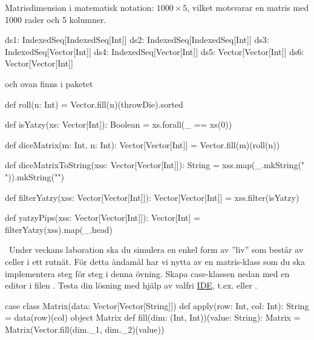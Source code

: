 \SubtaskSolved  Matrisdimension i matematisk notation: $1000 \times 5$, vilket motsvarar en matris med 1000 rader och 5 kolumner.

\SubtaskSolved
\begin{Code}
ds1: IndexedSeq[IndexedSeq[Int]]
ds2: IndexedSeq[IndexedSeq[Int]]
ds3: IndexedSeq[Vector[Int]]
ds4: IndexedSeq[Vector[Int]]
ds5: Vector[Vector[Int]]
ds6: Vector[Vector[Int]]
\end{Code}
 och  ovan finns i paketet 

\SubtaskSolved  \begin{Code}
def roll(n: Int) = Vector.fill(n)(throwDie).sorted
\end{Code}

\SubtaskSolved  \begin{Code}
def isYatzy(xs: Vector[Int]): Boolean = xs.forall(_ == xs(0))
\end{Code}



\SubtaskSolved  \begin{Code}
def diceMatrix(m: Int, n: Int): Vector[Vector[Int]] =
  Vector.fill(m)(roll(n))
\end{Code}

\SubtaskSolved  \begin{Code}
def diceMatrixToString(xss: Vector[Vector[Int]]): String =
  xss.map(_.mkString(" ")).mkString("\n")
\end{Code}


\SubtaskSolved
\begin{Code}
def filterYatzy(xss: Vector[Vector[Int]]): Vector[Vector[Int]] =
  xss.filter(isYatzy)
\end{Code}



\SubtaskSolved  \begin{Code}
def yatzyPips(xss: Vector[Vector[Int]]): Vector[Int] =
  filterYatzy(xss).map(_.head)
\end{Code}

\QUESTEND









\QUESTBEGIN

\Task\label{exe:matrices:labprep}  \what~Under veckans laboration ska du simulera en enkel form av ''liv'' som består av celler i ett rutnät. För detta ändamål har vi nytta av en matris-klass som du ska implementera steg för steg i denna övning.
Skapa case-klassen nedan med en editor i filen . Testa din lösning med hjälp av valfri \hyperref[appendix:ide]{IDE}, t.ex.  eller .
\begin{Code}
case class Matrix(data: Vector[Vector[String]]){
  def apply(row: Int, col: Int): String = data(row)(col)
}
object Matrix {
  def fill(dim: (Int, Int))(value: String): Matrix =
    Matrix(Vector.fill(dim._1, dim._2)(value))
}
\end{Code}

